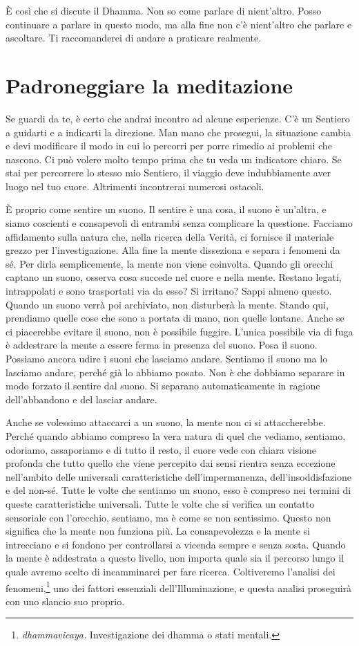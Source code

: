 È così che si discute il Dhamma. Non so come parlare di nient'altro.
Posso continuare a parlare in questo modo, ma alla fine non c'è
nient'altro che parlare e ascoltare. Ti raccomanderei di andare a
praticare realmente.

\section{Padroneggiare la meditazione}

Se guardi da te, è certo che andrai incontro ad alcune esperienze. C'è
un Sentiero a guidarti e a indicarti la direzione. Man mano che
prosegui, la situazione cambia e devi modificare il modo in cui lo
percorri per porre rimedio ai problemi che nascono. Ci può volere molto
tempo prima che tu veda un indicatore chiaro. Se stai per percorrere lo
stesso mio Sentiero, il viaggio deve indubbiamente aver luogo nel tuo
cuore. Altrimenti incontrerai numerosi ostacoli.

È proprio come sentire un suono. Il sentire è una cosa, il suono è
un'altra, e siamo coscienti e consapevoli di entrambi senza complicare
la questione. Facciamo affidamento sulla natura che, nella ricerca della
Verità, ci fornisce il materiale grezzo per l'investigazione. Alla fine
la mente disseziona e separa i fenomeni da sé. Per dirla semplicemente,
la mente non viene coinvolta. Quando gli orecchi captano un suono,
osserva cosa succede nel cuore e nella mente. Restano legati,
intrappolati e sono trasportati via da esso? Si irritano? Sappi almeno
questo. Quando un suono verrà poi archiviato, non disturberà la mente.
Stando qui, prendiamo quelle cose che sono a portata di mano, non quelle
lontane. Anche se ci piacerebbe evitare il suono, non è possibile
fuggire. L'unica possibile via di fuga è addestrare la mente a essere
ferma in presenza del suono. Posa il suono. Possiamo ancora udire i
suoni che lasciamo andare. Sentiamo il suono ma lo lasciamo andare,
perché già lo abbiamo posato. Non è che dobbiamo separare in modo
forzato il sentire dal suono. Si separano automaticamente in ragione
dell'abbandono e del lasciar andare.

Anche se volessimo attaccarci a un suono, la mente non ci si
attaccherebbe. Perché quando abbiamo compreso la vera natura di quel che
vediamo, \mbox{sentiamo}, odoriamo, assaporiamo e di tutto il resto, il cuore
vede con chiara visione profonda che tutto quello che viene percepito
dai sensi rientra senza eccezione nell'ambito delle universali
caratteristiche dell'impermanenza, dell'insoddisfazione e del non-sé.
Tutte le volte che sentiamo un suono, esso è compreso nei termini di
queste caratteristiche universali. Tutte le volte che si verifica un
contatto sensoriale con l'orecchio, sentiamo, ma è come se non
sentissimo. Questo non significa che la mente non funziona più. La
consapevolezza e la mente si intrecciano e si fondono per controllarsi a
vicenda sempre e senza sosta. Quando la mente è addestrata a questo
livello, non importa quale sia il percorso lungo il quale avremo scelto
di incamminarci per fare ricerca. Coltiveremo l'analisi dei
fenomeni,\footnote{\emph{dhammavicaya.} Investigazione dei dhamma
  o stati mentali.} uno dei fattori essenziali dell'Illuminazione, e
questa analisi proseguirà con uno slancio suo proprio.

